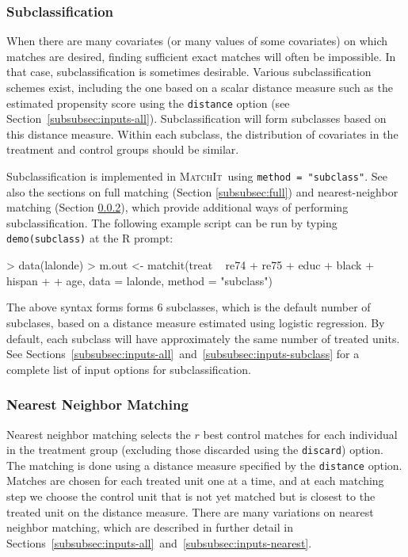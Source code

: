 \documentclass[oneside,letterpaper,titlepage]{article}
\newcommand{\MatchIt}{\textsc{MatchIt}}
\begin{document}
\subsubsection{Subclassification}
\label{subsubsec:subclass}

When there are many covariates (or many values of some covariates) on
which matches are desired, finding sufficient exact matches will often
be impossible.  In that case, subclassification is sometimes
desirable. Various subclassification schemes exist, including the one
based on a scalar distance measure such as the estimated propensity
score using the \texttt{distance} option (see
Section~\ref{subsubsec:inputs-all}).  Subclassification will form
subclasses based on this distance measure.  Within each subclass, the
distribution of covariates in the treatment and control groups should
be similar.

Subclassification is implemented in \MatchIt\ using \texttt{method =
  "subclass"}.  See also the sections on full matching (Section
\ref{subsubsec:full}) and nearest-neighbor matching (Section
\ref{subsubsec:nearest}), which provide additional ways of performing
subclassification.  The following example script can be run by typing
{\tt demo(subclass)} at the R prompt:

\begin{Schunk}
\begin{Sinput}
> data(lalonde)
> m.out <- matchit(treat ~ re74 + re75 + educ + black + hispan + 
+     age, data = lalonde, method = "subclass")
\end{Sinput}
\end{Schunk}

The above syntax forms forms 6 subclasses, which is the default number
of subclases, based on a distance measure estimated using logistic
regression.  By default, each subclass will have approximately the
same number of treated units.  See
Sections~\ref{subsubsec:inputs-all}~and~\ref{subsubsec:inputs-subclass}
for a complete list of input options for subclassification.

\subsubsection{Nearest Neighbor Matching}
\label{subsubsec:nearest}

Nearest neighbor matching selects the $r$ best control matches for
each individual in the treatment group (excluding those discarded
using the \texttt{discard}) option.  The matching is done using a
distance measure specified by the {\tt distance} option. Matches are
chosen for each treated unit one at a time, and at each matching step
we choose the control unit that is not yet matched but is closest to
the treated unit on the distance measure.  There are many variations
on nearest neighbor matching, which are described in further detail in
Sections~\ref{subsubsec:inputs-all}~and~\ref{subsubsec:inputs-nearest}.
\end{document}

